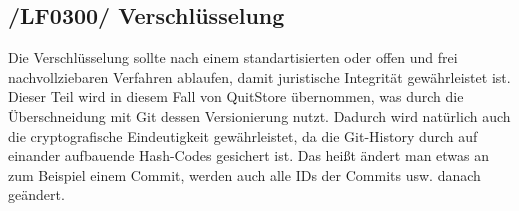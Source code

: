 \subsection{/LF0300/ Verschlüsselung}
Die Verschlüsselung sollte nach einem standartisierten oder offen und frei nachvollziebaren Verfahren ablaufen, damit juristische Integrität gewährleistet ist. 
Dieser Teil wird in diesem Fall von QuitStore übernommen, was durch die Überschneidung mit Git dessen Versionierung nutzt. Dadurch wird natürlich auch die cryptografische Eindeutigkeit gewährleistet, da die Git-History durch auf einander aufbauende Hash-Codes gesichert ist. Das heißt ändert man etwas an zum Beispiel einem Commit, werden auch alle IDs der Commits usw. danach geändert.
